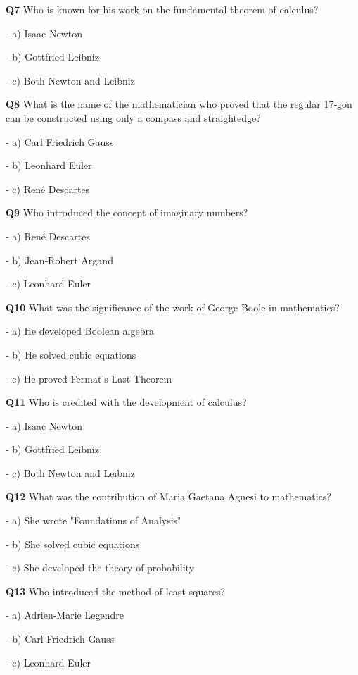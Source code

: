 \textbf{Q7} Who is known for his work on the fundamental theorem of calculus?\par
\quad - a) Isaac Newton\par
\quad - b) Gottfried Leibniz\par
\quad - c) Both Newton and Leibniz\par

\textbf{Q8} What is the name of the mathematician who proved that the regular 17‑gon can be constructed using only a compass and straightedge?\par
\quad - a) Carl Friedrich Gauss\par
\quad - b) Leonhard Euler\par
\quad - c) René Descartes\par

\textbf{Q9} Who introduced the concept of imaginary numbers?\par
\quad - a) René Descartes\par
\quad - b) Jean‑Robert Argand\par
\quad - c) Leonhard Euler\par

\textbf{Q10} What was the significance of the work of George Boole in mathematics?\par
\quad - a) He developed Boolean algebra\par
\quad - b) He solved cubic equations\par
\quad - c) He proved Fermat's Last Theorem\par

\textbf{Q11} Who is credited with the development of calculus?\par
\quad - a) Isaac Newton\par
\quad - b) Gottfried Leibniz\par
\quad - c) Both Newton and Leibniz\par

\textbf{Q12} What was the contribution of Maria Gaetana Agnesi to mathematics?\par
\quad - a) She wrote "Foundations of Analysis"\par
\quad - b) She solved cubic equations\par
\quad - c) She developed the theory of probability\par

\textbf{Q13} Who introduced the method of least squares?\par
\quad - a) Adrien‑Marie Legendre\par
\quad - b) Carl Friedrich Gauss\par
\quad - c) Leonhard Euler\par

